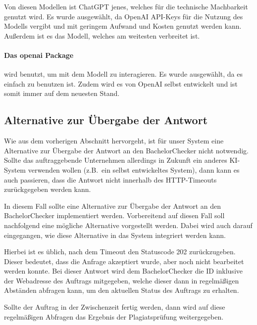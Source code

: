 Von diesen Modellen ist ChatGPT jenes, welches für die technische Machbarkeit genutzt wird.
Es wurde ausgewählt, da OpenAI API-Keys für die Nutzung des Modells vergibt und mit geringem Aufwand und Kosten genutzt werden kann.
Außerdem ist es das Modell, welches am weitesten verbreitet\autocite{statista.gpt} ist.

\paragraph{Das openai Package} wird benutzt, um mit dem Modell zu interagieren.
Es wurde ausgewählt, da es einfach zu benutzen ist.
Zudem wird es von OpenAI selbst entwickelt und ist somit immer auf dem neuesten Stand.


\subsection{Alternative zur Übergabe der Antwort}\label{subsec:alternative-zur-uebergabe-der-antwort}
Wie aus dem vorherigen Abschnitt hervorgeht, ist für unser System eine Alternative zur Übergabe der Antwort
an den BachelorChecker nicht notwendig.
Sollte das auftraggebende Unternehmen allerdings in Zukunft ein anderes KI-System verwenden wollen (z.B.\ ein selbst entwickeltes System),
dann kann es auch passieren, dass die Antwort nicht innerhalb des HTTP-Timeouts zurückgegeben werden kann.

In diesem Fall sollte eine Alternative zur Übergabe der Antwort an den BachelorChecker implementiert werden.
Vorbereitend auf diesen Fall soll nachfolgend eine mögliche Alternative vorgestellt werden.
Dabei wird auch darauf eingegangen, wie diese Alternative in das System integriert werden kann.

Hierbei ist es üblich, nach dem Timeout den Statuscode 202 zurückzugeben.
Dieser bedeutet, dass die Anfrage akzeptiert wurde, aber noch nicht bearbeitet werden konnte\autocite{mozilla}.
Bei dieser Antwort wird dem BachelorChecker die ID inklusive der Webadresse des Auftrags mitgegeben,
welche dieser dann in regelmäßigen Abständen abfragen kann, um den aktuellen Status des Auftrags zu erhalten.

Sollte der Auftrag in der Zwischenzeit fertig werden, dann wird auf diese regelmäßigen Abfragen das Ergebnis
der Plagiatsprüfung weitergegeben.

